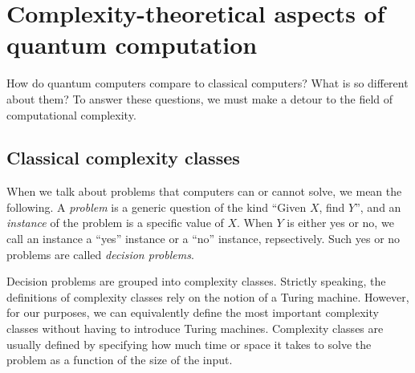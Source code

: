 \section{Complexity-theoretical aspects of quantum computation}


How do quantum computers compare to classical computers? What is so different about them? To answer these questions, we must make a detour to the field of computational complexity. 





\subsection{Classical complexity classes}


When we talk about problems that computers can or cannot solve, we mean the following. A \textit{problem} is a generic question of the kind ``Given $X$, find $Y$'', and an \textit{instance} of the problem is a specific value of $X$. When $Y$ is either yes or no, we call an instance a ``yes'' instance or a ``no'' instance, repsectively. Such yes or no problems are called \textit{decision problems}. 

Decision problems are grouped into complexity classes. Strictly speaking, the definitions of complexity classes rely on the notion of a Turing machine. However, for our purposes, we can equivalently define the most important complexity classes without having to introduce Turing machines. Complexity classes are usually defined by specifying how much time or space it takes to solve the problem as a function of the size of the input.

